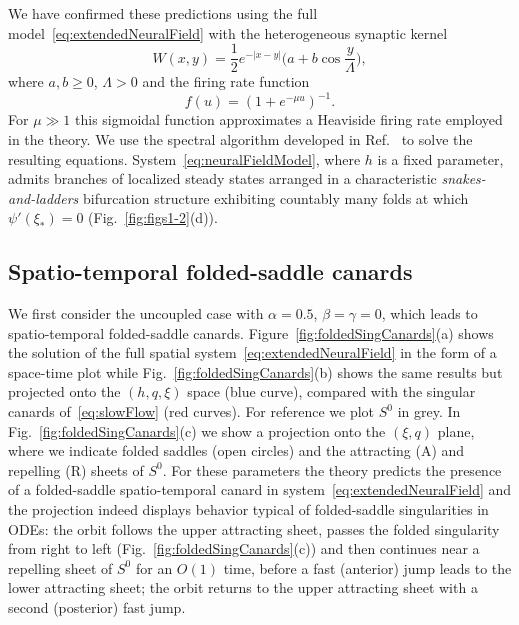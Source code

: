 \documentclass[aps,prl,reprint,superscriptaddress]{revtex4-1}
\newcommand{\DA}[1]{\textcolor{blue!80!white}{\texttt{DA}: #1}}
\newcommand{\edits}[1]{#1}
\begin{document}
%
%
We have confirmed these predictions using the full model~\eqref{eq:extendedNeuralField} 
with the heterogeneous synaptic kernel 
\begin{equation}\label{eq:heterokernel}
 W(x,y) = \frac{1}{2} e^{-|x-y|} \Big(a + b \cos \frac{y}{\Lambda} \Big),
\end{equation}
where $a,b \geq 0$, $\Lambda > 0$
and the firing rate function
\begin{equation}
  f(u) = (1 + e^{-\mu u})^{-1}.\label{eq:firingRateSupp}
\end{equation}
For $\mu \gg 1$ this sigmoidal function approximates a Heaviside firing rate employed
in the theory. We use the spectral algorithm developed in Ref.~\cite{Rankin:2014bz}
to solve the resulting equations. System~\eqref{eq:neuralFieldModel}, where $h$ is a
fixed parameter, admits branches of localized steady states arranged in a
characteristic \emph{snakes-and-ladders} bifurcation structure exhibiting countably
many folds at which $\psi'(\xi_*) = 0$ (Fig.~\ref{fig:figs1-2}(d)). 

\subsection{Spatio-temporal folded-saddle canards}

We first consider the uncoupled case with $\alpha=0.5$, $\beta=\gamma=0$, which leads
to spatio-temporal folded-saddle canards.
Figure~\ref{fig:foldedSingCanards}(a) shows the solution of the full spatial
system~\eqref{eq:extendedNeuralField} in the form of a space-time plot while
Fig.~\ref{fig:foldedSingCanards}(b) shows the same results but projected onto the
\edits{$(h,q,\xi)$} space (blue curve), compared with the singular canards
of~\eqref{eq:slowFlow} (red curves). For reference we
plot $S^0$ in grey. In Fig.~\ref{fig:foldedSingCanards}(c) we show a projection onto
the $(\xi,q)$ plane, where we indicate folded saddles (open circles) and the
attracting (A) and repelling (R) sheets of $S^0$. For these parameters the theory
predicts the presence of a folded-saddle spatio-temporal canard in
system~\eqref{eq:extendedNeuralField} and the projection indeed displays behavior
typical of folded-saddle singularities in ODEs: the orbit follows the upper
attracting sheet, passes the folded singularity from right to left
(Fig.~\ref{fig:foldedSingCanards}(c)) and then continues near a
repelling sheet of $S^0$ for an $O(1)$ time, before a fast (anterior) jump leads to
the lower attracting sheet; the orbit returns to the upper attracting sheet with a
second (posterior) fast jump. 
\end{document}
